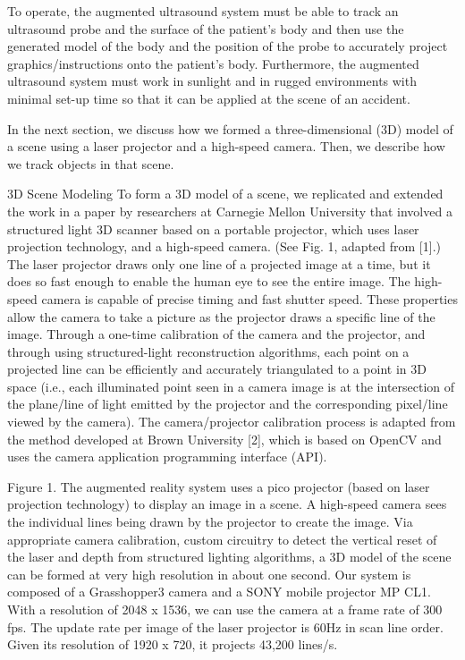 \documentclass{llncs}
\begin{document}
To operate, the augmented ultrasound system must be able to track an ultrasound probe and the surface of the patient’s body and then use the generated model of the body and the position of the probe to accurately project graphics/instructions onto the patient’s body.  Furthermore, the augmented ultrasound system must work in sunlight and in rugged environments with minimal set-up time so that it can be applied at the scene of an accident.  

In the next section, we discuss how we formed a three-dimensional (3D) model of a scene using a laser projector and a high-speed camera. Then, we describe how we track objects in that scene.

3D Scene Modeling
To form a 3D model of a scene, we replicated and extended the work in a paper by researchers at Carnegie Mellon University that involved a structured light 3D scanner based on a portable projector, which uses laser projection technology, and a high-speed camera. (See Fig. 1, adapted from [1].) The laser projector draws only one line of a projected image at a time, but it does so fast enough to enable the human eye to see the entire image. The high-speed camera is capable of precise timing and fast shutter speed. These properties allow the camera to take a picture as the projector draws a specific line of the image. Through a one-time calibration of the camera and the projector, and through using structured-light reconstruction algorithms, each point on a projected line can be efficiently and accurately triangulated to a point in 3D space (i.e., each illuminated point seen in a camera image is at the intersection of the plane/line of light emitted by the projector and the corresponding pixel/line viewed by the camera). The camera/projector calibration process is adapted from the method developed at Brown University [2], which is based on OpenCV and uses the camera application programming interface (API).


Figure 1. The augmented reality system uses a pico projector (based on laser projection technology) to display an image in a scene. A high-speed camera sees the individual lines being drawn by the projector to create the image. Via appropriate camera calibration, custom circuitry to detect the vertical reset of the laser and depth from structured lighting algorithms, a 3D model of the scene can be formed at very high resolution in about one second.
Our system is composed of a Grasshopper3 camera and a SONY mobile projector MP CL1. With a resolution of 2048 x 1536, we can use the camera at a frame rate of 300 fps. The update rate per image of the laser projector is 60Hz in scan line order. Given its resolution of 1920 x 720, it projects 43,200 lines/s.
\end{document}
